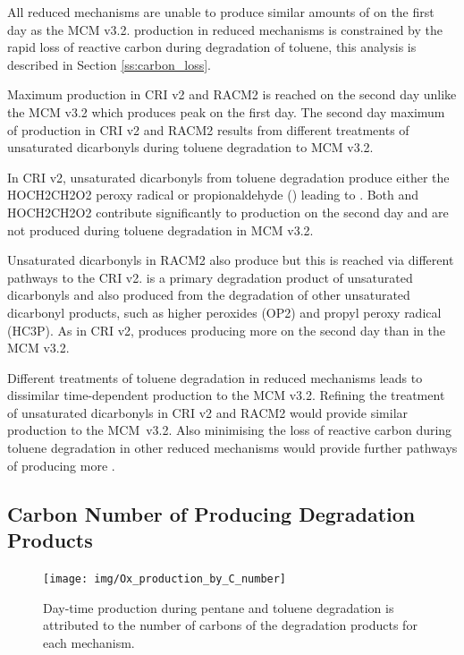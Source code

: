 All reduced mechanisms are unable to produce similar amounts of  on the first day as the MCM v3.2.
 production in reduced mechanisms is constrained by the rapid loss of reactive carbon during degradation of toluene, this analysis is described in Section \ref{ss:carbon_loss}.

Maximum  production in CRI v2 and RACM2 is reached on the second day unlike the MCM v3.2 which produces peak  on the first day.
The second day maximum of  production in CRI v2 and RACM2 results from different treatments of unsaturated dicarbonyls during toluene degradation to MCM v3.2.

In CRI v2, unsaturated dicarbonyls from toluene degradation produce either the HOCH2CH2O2 peroxy radical or propionaldehyde () leading to .
Both  and HOCH2CH2O2 contribute significantly to  production on the second day and are not produced during toluene degradation in MCM v3.2.

Unsaturated dicarbonyls in RACM2 also produce  but this is reached via different pathways to the CRI v2.
 is a primary degradation product of unsaturated dicarbonyls and also produced from the degradation of other unsaturated dicarbonyl products, such as higher peroxides (OP2) and propyl peroxy radical (HC3P).
As in CRI v2,  produces  producing more  on the second day than in the MCM v3.2.

Different treatments of toluene degradation in reduced mechanisms leads to dissimilar time-dependent  production to the MCM v3.2.
Refining the treatment of unsaturated dicarbonyls in CRI v2 and RACM2 would provide similar  production to the \mbox{MCM v3.2}.
Also minimising the loss of reactive carbon during toluene degradation in other reduced mechanisms would provide further pathways of producing more .

\subsection[Carbon Number of Ox Producing Degradation Products]{Carbon Number of  Producing Degradation Products} \label{ss:c_number} %

\begin{figure}
    \centering
    \texttt{[image: img/Ox\_production\_by\_C\_number]}
    \vspace{0mm}
    \caption{Day-time  production during pentane and toluene degradation is attributed to the number of carbons of the degradation products for each mechanism.}
    \vspace{-4mm}
    \label{f:carbon}
\end{figure}


